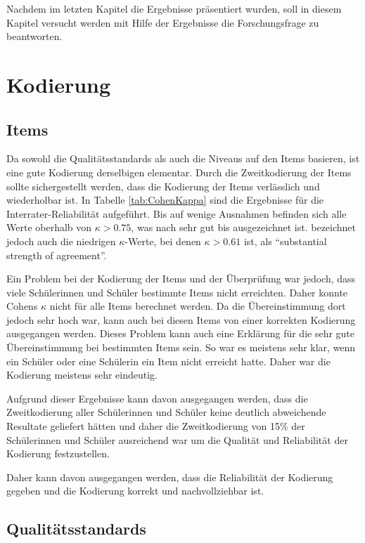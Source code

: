 

Nachdem im letzten Kapitel die Ergebnisse präsentiert wurden, soll in diesem Kapitel versucht werden mit Hilfe der Ergebnisse die Forschungsfrage zu beantworten.

\section{Kodierung}

\subsection{Items}

Da sowohl die Qualitätsstandards als auch die Niveaus auf den Items basieren, ist eine gute Kodierung derselbigen elementar. Durch die Zweitkodierung der Items sollte sichergestellt werden, dass die Kodierung der Items verlässlich und wiederholbar ist. In Tabelle \ref{tab:CohenKappa} sind die Ergebnisse für die Interrater-Reliabilität aufgeführt. Bis auf wenige Ausnahmen befinden sich alle Werte oberhalb von $\kappa > 0.75$, was nach \citet[S.111]{Greve1997} sehr gut bis ausgezeichnet ist. \citet{Landis1977} bezeichnet jedoch auch die niedrigen $\kappa$-Werte, bei denen $\kappa > 0.61$ ist, als "`substantial strength of agreement"'. 

Ein Problem bei der Kodierung der Items und der Überprüfung war jedoch, dass viele Schülerinnen und Schüler bestimmte Items nicht erreichten. Daher konnte Cohens $\kappa$ nicht für alle Items berechnet werden. Da die Übereinstimmung dort jedoch sehr hoch war, kann auch bei diesen Items von einer korrekten Kodierung ausgegangen werden. Dieses Problem kann auch eine Erklärung für die sehr gute Übereinstimmung bei bestimmten Items sein. So war es meistens sehr klar, wenn ein Schüler oder eine Schülerin ein Item nicht erreicht hatte. Daher war die Kodierung meistens sehr eindeutig.

Aufgrund dieser Ergebnisse kann davon ausgegangen werden, dass die Zweitkodierung aller Schülerinnen und Schüler keine deutlich abweichende Resultate geliefert hätten und daher die Zweitkodierung von 15\% der Schülerinnen und Schüler ausreichend war um die Qualität und Reliabilität der Kodierung festzustellen.

Daher kann davon ausgegangen werden, dass die Reliabilität der Kodierung gegeben und die Kodierung korrekt und nachvollziehbar ist.

\subsection{Qualitätsstandards}

